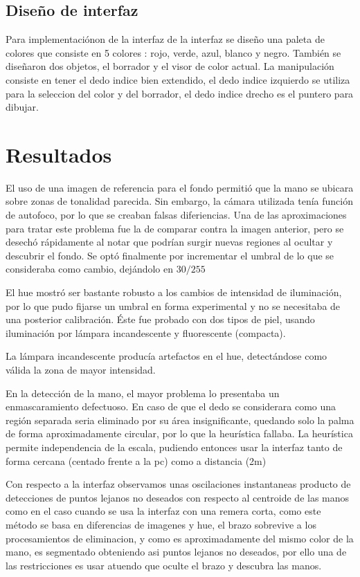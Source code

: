 \documentclass[conference,a4paper,10pt,oneside,final]{tfmpd}
\begin{document}
\subsection{Diseño de interfaz}
  Para implementaciónon de la interfaz de la interfaz se diseño una paleta de colores que consiste en 5 colores : rojo, verde, azul, blanco y negro. También se diseñaron dos objetos, el borrador y el visor de color actual.
La manipulación consiste en tener el dedo indice bien extendido, el dedo indice izquierdo se utiliza para la seleccion del color y del borrador, el dedo indice drecho es el puntero para dibujar.

	
\section{Resultados}
		El uso de una imagen de referencia para el fondo permitió que la mano se ubicara sobre zonas de tonalidad parecida.
		Sin embargo, la cámara utilizada tenía función de autofoco, por lo que se creaban falsas diferiencias. 
Una de las aproximaciones para tratar este problema fue la de comparar contra la imagen anterior, pero se desechó rápidamente al notar que podrían surgir nuevas regiones al ocultar y descubrir el fondo.
Se optó finalmente por incrementar el umbral de lo que se consideraba como cambio, dejándolo en $30/255$

		El hue mostró ser bastante robusto a los cambios de intensidad de iluminación, por lo que pudo fijarse un umbral en forma experimental y no se necesitaba de una posterior calibración. 
Éste fue probado con dos tipos de piel, usando iluminación por lámpara incandescente y fluorescente (compacta).

	La lámpara incandescente producía artefactos en el hue, detectándose como válida la zona de mayor intensidad. 
	
	En la detección de la mano, el mayor problema lo presentaba un enmascaramiento defectuoso. En caso de que el dedo se considerara como una región separada seria eliminado por su área insignificante, quedando solo la palma
de forma aproximadamente circular, por lo que la heurística fallaba.
	La heurística permite independencia de la escala, pudiendo entonces usar la interfaz tanto de forma cercana (centado frente a la pc) como a distancia (2m) %

		Con respecto a la interfaz observamos unas oscilaciones instantaneas producto de detecciones de puntos lejanos no deseados con respecto al centroide de las manos como en el caso cuando se usa la interfaz con una remera corta, como este método se basa en diferencias de imagenes y hue, el brazo sobrevive a los procesamientos  de eliminacion, y como es aproximadamente del mismo color de la mano, es segmentado obteniendo asi puntos lejanos no deseados, por ello una de las restricciones es usar  atuendo que oculte el brazo y descubra las manos.
\end{document}
